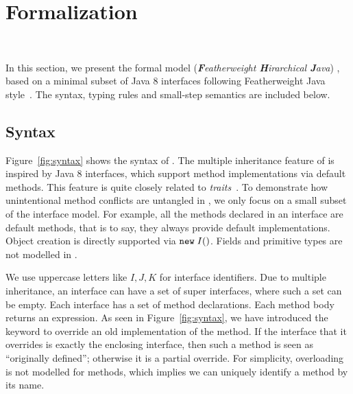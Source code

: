 \section{Formalization}~\label{sec:formalization}


In this section, we present the formal model \MIM{} (\emph{\textbf{F}eatherweight \textbf{H}irarchical \textbf{J}ava}) , based on
a minimal subset of Java 8 interfaces following Featherweight Java style~\cite{Igarashi01FJ}.
The syntax, typing rules and small-step semantics are included below.

\subsection{Syntax}
Figure~\ref{fig:syntax} shows the syntax of \MIM{}. The multiple
inheritance feature of \MIM{} is inspired by Java 8 interfaces, which support
method implementations via default methods. This feature is quite
closely related to \emph{traits}~\cite{scharli03traits}.  To demonstrate how
unintentional method conflicts are untangled in \MIM{}, we only focus on a small
subset of the interface model. For example, all the methods declared
in an interface are default methods, that is to say, they always
provide default implementations. 
Object creation is directly supported via $\texttt{new} \; I()$. 
Fields and primitive types are not modelled in \MIM{}.

We use uppercase letters like $I, J, K$ for interface identifiers. 
Due to multiple inheritance, an interface can have a set of
super interfaces, where such a set can be empty. Each interface
has a set of method declarations. Each method body returns
an expression. As seen in Figure~\ref{fig:syntax}, we have introduced the
\kwoverride{} keyword to override an old implementation of the
method. If the interface that it overrides is exactly the enclosing
interface, then such a method is seen as ``originally defined''; otherwise
it is a partial override.
For simplicity, overloading is not modelled for methods, which
implies we can uniquely identify a method by its name.

